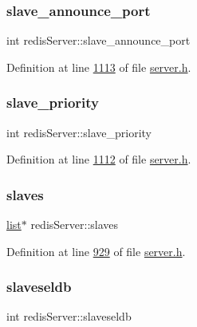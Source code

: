 \subsubsection{\texorpdfstring{slave\+\_\+announce\+\_\+port}{slave\_announce\_port}}
{\footnotesize\ttfamily int redis\+Server\+::slave\+\_\+announce\+\_\+port}



Definition at line \hyperlink{server_8h_source_l01113}{1113} of file \hyperlink{server_8h_source}{server.\+h}.

\mbox{\label{structredisServer_a30332ecb91ab2b62bec5b08a9495c196}} 
\subsubsection{\texorpdfstring{slave\+\_\+priority}{slave\_priority}}
{\footnotesize\ttfamily int redis\+Server\+::slave\+\_\+priority}



Definition at line \hyperlink{server_8h_source_l01112}{1112} of file \hyperlink{server_8h_source}{server.\+h}.

\mbox{\label{structredisServer_a1785c47ee342c2f85bc58f83f4fdd302}} 
\subsubsection{\texorpdfstring{slaves}{slaves}}
{\footnotesize\ttfamily \hyperlink{structlist}{list}$\ast$ redis\+Server\+::slaves}



Definition at line \hyperlink{server_8h_source_l00929}{929} of file \hyperlink{server_8h_source}{server.\+h}.

\mbox{\label{structredisServer_afe78e4e80a36504c23fb1e19f62ddd61}} 
\subsubsection{\texorpdfstring{slaveseldb}{slaveseldb}}
{\footnotesize\ttfamily int redis\+Server\+::slaveseldb}



